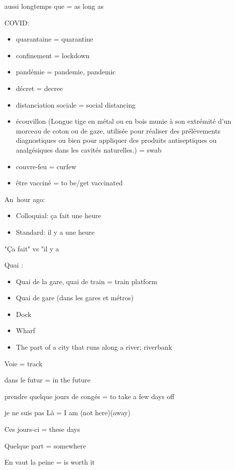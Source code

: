 aussi longtemps que = as long as

COVID:

\begin{itemize}
\item
  quarantaine = quarantine
\item
  confinement = lockdown
\item
  pandémie = pandemie, pandemic
\item
  décret = decree
\item
  distanciation sociale = social distancing
\item
  écouvillon (Longue tige en métal ou en bois munie à son extrémité d'un
  morceau de coton ou de gaze, utilisée pour réaliser des prélèvements
  diagnostiques ou bien pour appliquer des produits antiseptiques ou
  analgésiques dans les cavités naturelles.) = swab
\item
  couvre-feu = curfew
\item
  être vacciné = to be/get vaccinated
\end{itemize}

An~hour ago:

\begin{itemize}
\item
  Colloquial: ça fait une heure~
\item
  Standard: il y a une heure~
\end{itemize}

"Ça fait" vs "il y a

Quai :

\begin{itemize}
\item
  Quai de la gare, quai de train = train platform~
\item
  Quai de gare (dans les gares et métros)
\item
  Dock
\item
  Wharf
\item
  The part of a city that runs along a river; riverbank~
\end{itemize}

Voie = track

dans le futur = in the future

prendre quelque jours de congés = to take a few days off

je ne suis pas Là = I am (not here)(away)

Ces jours-ci = these days

Quelque part = somewhere~

En vaut la peine = is worth it


